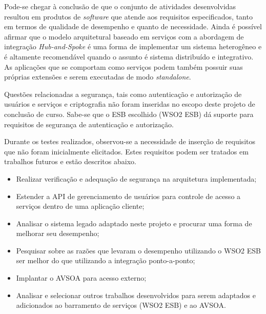 Pode-se chegar à conclusão de que o conjunto de atividades desenvolvidas resultou em produtos de \textit{software} que atende aos requisitos especificados, tanto em termos de qualidade de desempenho e quanto de necessidade. Ainda é possível afirmar que o modelo arquitetural baseado em serviços com a abordagem de integração \textit{Hub-and-Spoke} é uma forma de implementar um sistema heterogêneo e é altamente recomendável quando o assunto é sistema distribuído e integrativo. As aplicações que se comportam como serviços podem também possuir suas próprias extensões e serem executadas de modo \textit{standalone}.

Questões relacionadas a segurança, tais como autenticação e autorização de usuários e serviços e criptografia não foram inseridas no escopo deste projeto de conclusão de curso. Sabe-se que o ESB escolhido (WSO2 ESB) dá suporte para requisitos de segurança de autenticação e autorização. 

Durante os testes realizados, observou-se a necessidade de inserção de requisitos que não foram inicialmente elicitados. Estes requisitos podem ser tratados em trabalhos futuros e estão descritos abaixo.

\begin{itemize}
\item Realizar verificação e adequação de segurança na arquitetura implementada;
\item Estender a API de gerenciamento de usuários para controle de acesso a serviços dentro de uma aplicação cliente;
\item Analisar o sistema legado adaptado neste projeto e procurar uma forma de melhorar seu desempenho;
\item Pesquisar sobre as razões que levaram o desempenho utilizando o WSO2 ESB ser melhor do que utilizando a integração ponto-a-ponto;
\item Implantar o AVSOA para acesso externo;
\item Analisar e selecionar outros trabalhos desenvolvidos para serem adaptados e adicionados ao barramento de serviços (WSO2 ESB) e ao AVSOA.
\end{itemize}


